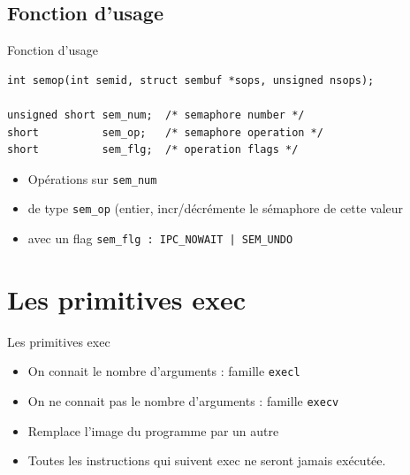 \begin{frame}[containsverbatim]{\sectitle}
\def\subsectitle{Fonction d'usage}
\subsection{\subsectitle}
\begin{block}{\subsectitle}
\begin{verbatim}
int semop(int semid, struct sembuf *sops, unsigned nsops);

unsigned short sem_num;  /* semaphore number */
short          sem_op;   /* semaphore operation */
short          sem_flg;  /* operation flags */
\end{verbatim}
\begin{itemize}
    \item Opérations sur \texttt{sem\_num}
    \item de type \texttt{sem\_op} (entier, incr/décrémente le sémaphore de
    cette valeur
    \item avec un flag \texttt{sem\_flg : IPC\_NOWAIT | SEM\_UNDO} 
\end{itemize}
\end{block}
\end{frame}

\def\sectitle{Les primitives exec}
\section{\sectitle}
\begin{frame}{\sectitle}
\begin{block}{\subsectitle}
\begin{itemize}
    \item On connait le nombre d'arguments : famille \texttt{execl}
    \item On ne connait pas le nombre d'arguments : famille \texttt{execv}
\end{itemize}
\end{block}

\begin{block}{\subsectitle}
\begin{itemize}
    \item Remplace l'image du programme par un autre
    \item Toutes les instructions qui suivent exec ne seront jamais exécutée.
\end{itemize}
\end{block}

\end{frame}



